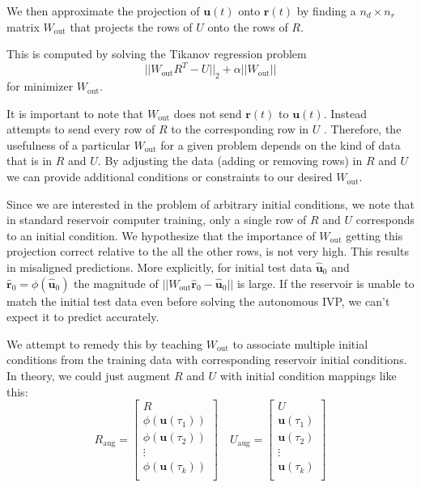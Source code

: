 \documentclass{article}
\begin{document}
We then approximate the projection of $\mathbf{u}(t)$ onto $\mathbf{r}(t)$ by finding a $n_d \times n_r$ matrix $W_\text{out}$ that projects the rows of $U$ onto the rows of $R$.

This is computed by solving the Tikanov regression problem
\[ ||W_\text{out} R^T - U||_2 + \alpha ||W_\text{out}||
\]
 for minimizer $W_\text{out}$.
 
 It is important to note that $W_\text{out}$ does not send $\mathbf{r}(t)$ to $\mathbf{u}(t)$. Instead attempts to send every row of $R$ to the corresponding row in $U$ . Therefore, the usefulness of a particular $W_\text{out}$ for a given problem depends on the kind of data that is in $R$ and $U$. By adjusting the data (adding or removing rows) in $R$ and $U$ we can provide additional conditions or constraints to our desired $W_\text{out}$. 
 
 Since we are interested in the problem of arbitrary initial conditions, we note that in standard reservoir computer training, only a single row of $R$ and $U$ corresponds to an initial condition. We hypothesize that the importance of $W_\text{out}$ getting this projection correct relative to the all the other rows, is not very high. This results in misaligned predictions.  
 More explicitly, for initial test data $\mathbf{\hat{u}}_0$
  and $\mathbf{\hat{r}}_0 = \phi(\mathbf{\hat{u}}_0)$  
 the magnitude of $||W_\text{out}\mathbf{\hat{r}}_0  - \mathbf{\hat{u}}_0 ||$ is large. If the reservoir is unable to match the initial test data even before solving the autonomous IVP, we can't expect it to predict accurately.
 
 
 We attempt to remedy this by teaching $W_\text{out}$ to associate multiple initial conditions from the training data with corresponding reservoir initial conditions. In theory, we could just augment $R$ and $U$ with initial condition mappings like this:
 \[
 R_\text{aug} = 
 \begin{bmatrix}
 R \\
 \phi(\mathbf{u}(\tau_1)) \\
 \phi(\mathbf{u}(\tau_2)) \\
 \vdots \\
 \phi(\mathbf{u}(\tau_k)) \\
 \end{bmatrix}
 \quad
  U_\text{aug} = 
 \begin{bmatrix}
 U \\
 \mathbf{u}(\tau_1) \\
 \mathbf{u}(\tau_2) \\
 \vdots \\
 \mathbf{u}(\tau_k) \\
 \end{bmatrix}
 \]
\end{document}
